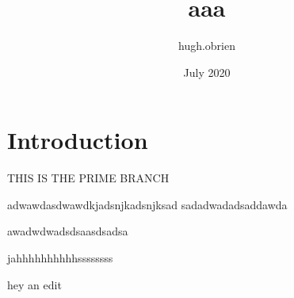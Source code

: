 \documentclass{article}
\title{aaa}
\author{hugh.obrien }
\date{July 2020}
\begin{document}
\maketitle

\section{Introduction}

THIS IS THE PRIME BRANCH

adwawdasdwawdkjadsnjkadsnjksad
sadadwadadsaddawda

awadwdwadsdsaasdsadsa

jahhhhhhhhhhssssssss

hey an edit
\end{document}
